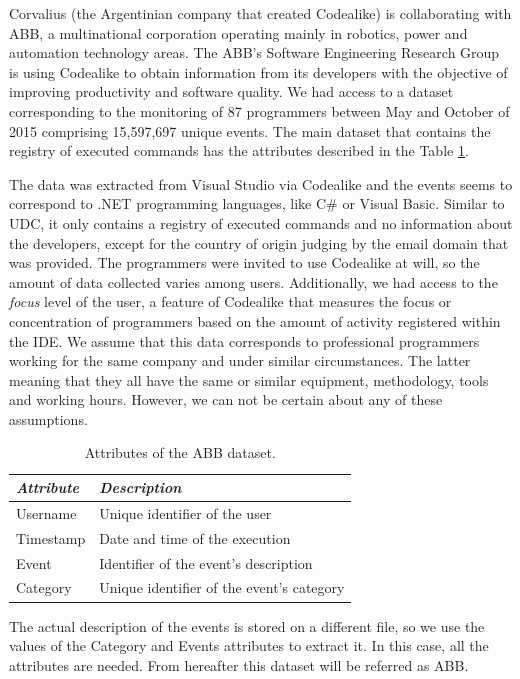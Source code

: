 \documentclass[conference]{IEEEtran}
\begin{document}
Corvalius (the Argentinian company that created Codealike) is collaborating with ABB, a multinational corporation operating mainly in robotics, power and automation technology areas. The ABB's Software Engineering Research Group is using Codealike to obtain information from its developers with the objective of improving productivity and software quality. We had access to a dataset corresponding to the monitoring of 87 programmers between May and October of 2015 comprising 15,597,697 unique events. The main dataset that contains the registry of executed commands has the attributes described in the Table \ref{tbl:att_abb}.

The data was extracted from Visual Studio via Codealike and the events seems to correspond to .NET programming languages, like C\# or Visual Basic. Similar to UDC, it only contains a registry of executed commands and no information about the developers, except for the country of origin judging by the email domain that was provided. The programmers were invited to use Codealike at will, so the amount of data collected varies among users. Additionally, we had access to the \emph{focus} level of the user, a feature of Codealike that measures the focus or concentration of programmers based on the amount of activity registered within the IDE. We assume that this data corresponds to professional programmers working for the same company and under similar circumstances. The latter meaning that they all have the same or similar equipment, methodology, tools and working hours. However, we can not be certain about any of these assumptions.

\begin{table}[ht!]
	\small
	\caption{Attributes of the ABB dataset. }
	\label{tbl:att_abb}
	\centering
	\begin{tabular}{|p{1.5cm}|p{5cm}|} 
		\hline 
		\emph{Attribute} & \emph{Description} \\  
		\hline 
		\hline 
		Username &  Unique identifier of the user \\
		\hline
		Timestamp & Date and time of the execution  \\
		\hline
		Event & Identifier of the event's description  \\
		\hline
		Category & Unique identifier of the event's category \\
		\hline
	\end{tabular}
	
\end{table}

The actual description of the events is stored on a different file, so we use the values of the Category and Events attributes to extract it. In this case, all the attributes are needed. From hereafter this dataset will be referred as ABB.
\end{document}
